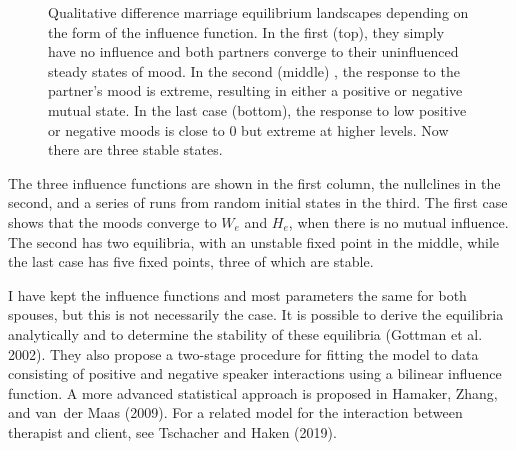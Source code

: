 \documentclass[
  a4paper,
  DIV=11,
  numbers=noendperiod,
  oneside]{scrreprt}
\begin{document}
\begin{figure}


\caption{\label{fig-ch4n-img10-old-58}Qualitative difference marriage
equilibrium landscapes depending on the form of the influence function.
In the first (top), they simply have no influence and both partners
converge to their uninfluenced steady states of mood. In the second
(middle) , the response to the partner's mood is extreme, resulting in
either a positive or negative mutual state. In the last case (bottom),
the response to low positive or negative moods is close to 0 but extreme
at higher levels. Now there are three stable states.}

\end{figure}%

The three influence functions are shown in the first column, the
nullclines in the second, and a series of runs from random initial
states in the third. The first case shows that the moods converge to
\(W_{e}\) and \(H_{e}\), when there is no mutual influence. The second
has two equilibria, with an unstable fixed point in the middle, while
the last case has five fixed points, three of which are stable.

I have kept the influence functions and most parameters the same for
both spouses, but this is not necessarily the case. It is possible to
derive the equilibria analytically and to determine the stability of
these equilibria (Gottman et al. 2002). They also propose a two-stage
procedure for fitting the model to data consisting of positive and
negative speaker interactions using a bilinear influence function. A
more advanced statistical approach is proposed in Hamaker, Zhang, and
van~der Maas (2009). For a related model for the interaction between
therapist and client, see Tschacher and Haken (2019).
\end{document}
